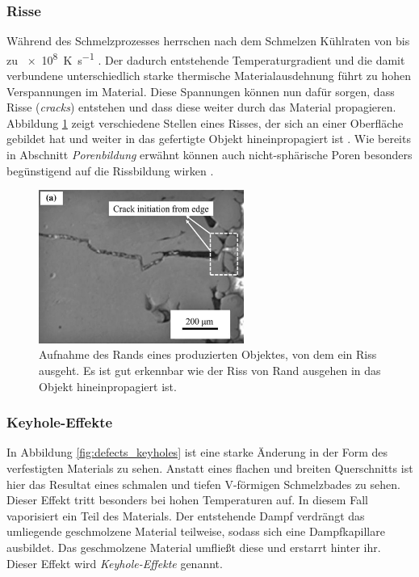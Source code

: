 		\subsubsection{Risse}
		Während des Schmelzprozesses herrschen nach dem Schmelzen Kühlraten von bis zu
		\SI{e8}{\kelvin\per\second} \cite{zhang2017defect}. Der dadurch entstehende
		Temperaturgradient und die damit verbundene unterschiedlich starke thermische
		Materialausdehnung führt zu hohen Verspannungen im Material. Diese Spannungen können nun
		dafür sorgen, dass Risse (\emph{cracks}) entstehen und dass diese weiter durch das
		Material propagieren. Abbildung \ref{fig:defects_cracks} zeigt verschiedene Stellen eines
		Risses, der sich an einer Oberfläche gebildet hat und weiter in das gefertigte Objekt
		hineinpropagiert ist \cite{zhang2017defect}. Wie bereits in Abschnitt \emph{Porenbildung}
		erwähnt können auch nicht-sphärische Poren besonders begünstigend auf die Rissbildung wirken
		\cite{galy2018main}.

		\begin{figure}[!ht]
			\centering
			\includegraphics[width=0.6\textwidth]{chapter/main/img/defects/cracks_part.png}
			\caption{Aufnahme des Rands eines produzierten Objektes, von dem ein Riss ausgeht. Es
			ist gut erkennbar wie der Riss von Rand ausgehen in das Objekt hineinpropagiert ist.
			\cite{zhang2017defect}}
			\label{fig:defects_cracks}
		\end{figure}

		\subsubsection{Keyhole-Effekte}
		In Abbildung \ref{fig:defects_keyholes} ist eine starke Änderung in der Form des
		verfestigten Materials zu sehen. Anstatt eines flachen und breiten Querschnitts ist hier
		das Resultat eines schmalen und tiefen V-förmigen Schmelzbades zu sehen. Dieser Effekt
		tritt besonders bei hohen Temperaturen auf. In diesem Fall vaporisiert ein Teil des
		Materials. Der entstehende Dampf verdrängt das umliegende geschmolzene Material teilweise,
		sodass sich eine Dampfkapillare ausbildet. Das geschmolzene Material umfließt diese und
		erstarrt hinter ihr. Dieser Effekt wird \emph{Keyhole-Effekte} genannt.

